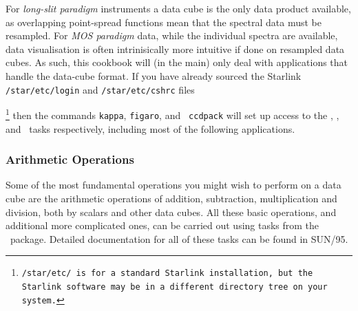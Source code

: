 \documentclass[twoside,11pt]{article}
\newcommand{\latex}[1]{#1}
\begin{document}
For {\em long-slit paradigm} instruments a data cube is the only data
product available, as overlapping point-spread functions mean that the
spectral data must be resampled.  For {\em MOS paradigm} data, while
the individual spectra are available, data visualisation is often
intrinisically more intuitive if done on resampled data cubes.  As
such, this cookbook will (in the main) only deal with applications
that handle the data-cube format.  If you have already sourced the
Starlink {\tt /star/etc/login} and {\tt /star/etc/cshrc} 
files{\footnote {\tt /star/etc/ is for a standard Starlink installation,
but the Starlink software may be in a different directory tree on your
system.} then the commands {\tt kappa}, {\tt figaro}, and {\tt
ccdpack} will set up access to the \KAPPAref, \FIGAROref, and
\CCDPACKref\ tasks respectively, including most of the following
applications.

\subsubsection{Arithmetic Operations}

Some of the most fundamental operations you might wish to perform on a
data cube are the arithmetic operations of addition, subtraction,
multiplication and division, both by scalars and other data cubes.  All
these basic operations, and additional more complicated ones, can be
carried out using tasks from the \KAPPAref\ package.
\latex{Detailed documentation for all of these tasks can be found
in SUN/95.}

\begin{itemize}


\end{itemize}}
\end{document}
